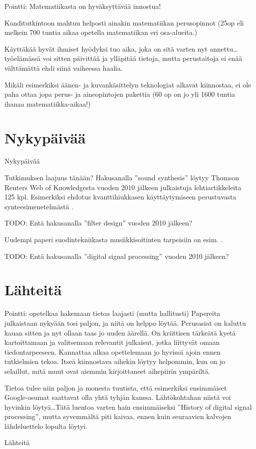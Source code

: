 \documentclass[pdf,10pt]{beamer}
\begin{document}
\begin{frame}{Pointti: Matematiikasta on hyväksyttävää innostua!}

  Kanditutkintoon mahtuu helposti ainakin matematiikan perusopinnot
  (25op eli melkein 700 tuntia aikaa opetella matematiikan eri
  osa-alueita.)

  Käyttäkää hyvät ihmiset hyödyksi tuo aika, joka on sitä varten nyt
  annettu\ldots työelämässä voi sitten päivittää ja ylläpitää tietoja,
  mutta perustaitoja ei enää välttämättä ehdi siinä vaiheessa haalia.

  Mikäli esimerkiksi äänen- ja kuvankäsittelyn teknologiat alkavat
  kiinnostaa, ei ole paha ottaa jopa perus- ja aineopintojen
  pakettia (60 op on jo yli 1600 tuntia ihanaa matematiikka-aikaa!)

\end{frame}



\section{Nykypäivää}
\begin{frame}{Nykypäivää}

  Tutkimuksen laajuus tänään? Hakusanalla ''sound synthesis'' löytyy
  Thomson Reuters Web of Knowledgesta vuoden 2010 jälkeen julkaistuja
  lehtiartikkeleita 125 kpl. Esimerkiksi ehdotus kvanttihiukkasen
  käyttäytymiseen perustuvasta synteesimenetelmästä
  \cite{CadizRamos2014quantum}.

  TODO: Entä hakusanalla ''filter design'' vuoden 2010 jälkeen?

  Uudempi paperi suodintekniikasta musiikkisoitinten tarpeisiin on
  esim. \cite{Wishnick14timevaryingfilters}.

  TODO: Entä hakusanalla ''digital signal processing'' vuoden 2010 jälkeen?

\end{frame}


\section{Lähteitä}

\begin{frame}{Pointti: opetelkaa hakemaan tietoa laajasti (mutta hallitusti)}
  Papereita julkaistaan nykyään tosi paljon, ja niitä on helppo
  löytää. Perusasiat on kaluttu kauan sitten ja nyt ollaan taas jo
  uuden äärellä. On kriittisen tärkeätä kyetä kartoittamaan ja
  valitsemaan relevantit julkaisut, jotka liittyvät omaan
  tiedontarpeeseen. Kannattaa alkaa opettelemaan jo hyvissä ajoin
  ennen tutkielmien tekoa. Itseä kiinnostava aihekin löytyy helpommin,
  kun on jo selaillut, mitä muut ovat aiemmin kirjoittaneet aihepiirin
  ympäriltä.

  Tietoa tulee niin paljon ja monesta tuutista, että esimerkiksi
  ensimmäiset Google-osumat saattavat olla yhtä tyhjän
  kanssa. Lähtökohtahan niistä voi hyvinkin löytyä\ldots Tätä luentoa
  varten hain ensimmäiseksi ''History of digital signal processing'',
  mutta syvemmältä piti kaivaa, ennen kuin seuraavien kalvojen
  lähdeluettelo lopulta löytyi. 
\end{frame}

\begin{frame}[allowframebreaks]{Lähteitä}
\tiny


\end{frame}
\end{document}
